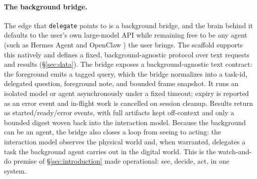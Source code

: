 

\paragraph{\textbf{The background bridge.}} The edge that \texttt{delegate} points to is a background bridge, and the brain behind it defaults to the user's own large-model API while remaining free to be any agent (such as Hermes Agent \cite{hermesagent} and OpenClaw \cite{openclaw} ) the user brings. The scaffold supports this natively and defines a fixed, background-agnostic protocol over text requests and results (§\ref{sec:data}). The bridge exposes a background-agnostic text contract: the foreground emits a tagged query, which the bridge normalizes into a task-id, delegated question, foreground note, and bounded frame snapshot. It runs an isolated model or agent asynchronously under a fixed timeout; expiry is reported as an error event and in-flight work is cancelled on session cleanup. Results return as started/ready/error events, with full artifacts kept off-context and only a bounded digest woven back into the interaction model. Because the background can be an agent, the bridge also closes a loop from seeing to acting: the interaction model observes the physical world and, when warranted, delegates a task the background agent carries out in the digital world. This is the watch-and-do premise of \S\ref{sec:introduction} made operational: see, decide, act, in one system. 



